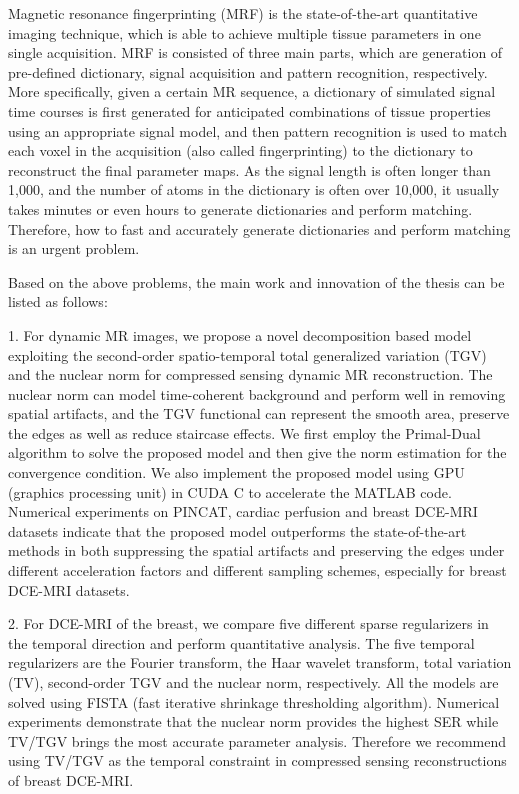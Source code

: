 \begin{englishabstract}
Magnetic resonance fingerprinting (MRF) is the state-of-the-art quantitative imaging technique, which is able to achieve multiple tissue parameters in one single acquisition. MRF is consisted of three main parts, which are generation of pre-defined dictionary, signal acquisition and pattern recognition, respectively. More specifically, given a certain MR sequence, a dictionary of simulated signal time courses is first generated for anticipated combinations of tissue properties using an appropriate signal model, and then pattern recognition is used to match each voxel in the acquisition (also called fingerprinting) to the dictionary to reconstruct the final parameter maps. As the signal length is often longer than 1,000, and the number of atoms in the dictionary is often over 10,000, it usually takes minutes or even hours to generate dictionaries and perform matching. Therefore, how to fast and accurately generate dictionaries and perform matching is an urgent problem.

Based on the above problems, the main work and innovation of the thesis can be listed as follows:

1. For dynamic MR images, we propose a novel decomposition based model exploiting the second-order spatio-temporal total generalized variation (TGV) and the nuclear norm for compressed sensing dynamic MR reconstruction. The nuclear norm can model time-coherent background and perform well in removing spatial artifacts, and the TGV functional can represent the smooth area, preserve the edges as well as reduce staircase effects. We first employ the Primal-Dual algorithm to solve the proposed model and then give the norm estimation for the convergence condition. We also implement the proposed model using GPU (graphics processing unit) in CUDA C to accelerate the MATLAB code. Numerical experiments on PINCAT, cardiac perfusion and breast DCE-MRI datasets indicate that the proposed model outperforms the state-of-the-art methods in both suppressing the spatial artifacts and preserving the edges under different acceleration factors and different sampling schemes, especially for breast DCE-MRI datasets.

2. For DCE-MRI of the breast, we compare five different sparse regularizers in the temporal direction and perform quantitative analysis. The five temporal regularizers are the Fourier transform, the Haar wavelet transform, total variation (TV), second-order TGV and the nuclear norm, respectively. All the models are solved using FISTA (fast iterative shrinkage thresholding algorithm). Numerical experiments demonstrate that the nuclear norm provides the highest SER while TV/TGV brings the most accurate parameter analysis. Therefore we recommend using TV/TGV as the temporal constraint in compressed sensing reconstructions of breast DCE-MRI.


\end{englishabstract}
